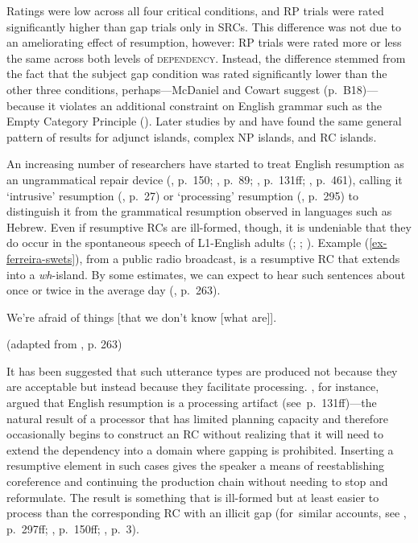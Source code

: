 Ratings were low across all four critical conditions, and RP trials were rated significantly higher than gap trials only in SRCs. This difference was not due to an ameliorating effect of resumption, however: RP trials were rated more or less the same across both levels of \textsc{dependency}. Instead, the difference stemmed from the fact that the subject gap condition was rated significantly lower than the other three conditions, perhaps---McDaniel and Cowart suggest (p.~B18)---because it violates an additional constraint on English grammar such as the Empty Category Principle (\cite{chomsky1981}). Later studies by \textcite{keffala.goodall2011} and \textcite{han.etal2012} have found the same general pattern of results for adjunct islands, complex NP islands, and RC islands. 

An increasing number of researchers have started to treat English resumption as an ungrammatical repair device (\cite{alexopoulou.keller2007}, p.~150; \cite{chacon2015}, p.~89; \cite{kroch1981}, p.~131ff; \cite{sells1984}, p.~461), calling it `intrusive' resumption (\cite{sells1984}, p.~27) or `processing' resumption (\cite{asudeh2004}, p.~295) to distinguish it from the grammatical resumption observed in languages such as Hebrew. Even if resumptive RCs are ill-formed, though, it is undeniable that they do occur in the spontaneous speech of L1-English adults (\cite{asudeh2004}; \cite{cann.etal2005}; \cite{prince1990}). Example (\ref{ex-ferreira-swets}), from a public radio broadcast, is a resumptive RC that extends into a \textit{wh}-island. By some estimates, we can expect to hear such sentences about once or twice in the average day (\cite{ferreira.swets2005}, p.~263).

\ex\label{ex-ferreira-swets}
We're afraid of things [that we don't know [what  are]].\par\nobreak\vspace{5pt}
\hfill (adapted from \cite{ferreira.swets2005}, p. 263)
\xe 

\noindent It has been suggested that such utterance types are produced not because they are acceptable but instead because they facilitate processing. \textcite{kroch1981}, for instance, argued that English resumption is a processing artifact (see~p.~131ff)---the natural result of a processor that has limited planning capacity and therefore occasionally begins to construct an RC without realizing that it will need to extend the dependency into a domain where gapping is prohibited. Inserting a resumptive element in such cases gives the speaker a means of reestablishing coreference and continuing the production chain without needing to stop and reformulate. The result is something that is ill-formed but at least easier to process than the corresponding RC with an illicit gap (for~similar accounts, see \cite{asudeh2004}, p.~297ff; \cite{chacon2015}, p.~150ff; \cite{chacon2019}, p.~3).

